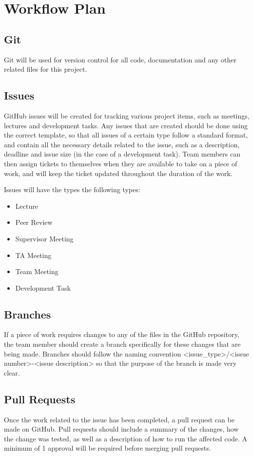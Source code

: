 \documentclass{article}
\begin{document}
\section{Workflow Plan}

\subsection*{Git}
Git will be used for version control for all code, documentation and any other related files for this project.

\subsection*{Issues}
GitHub issues will be created for tracking various project items, such as meetings, lectures and development tasks. Any issues that are created should be done using the correct template, so that all issues of a certain type follow a standard format, and contain all the necessary details related to the issue, such as a description, deadline and issue size (in the case of a development task). Team members can then assign tickets to themselves when they are available to take on a piece of work, and will keep the ticket updated throughout the duration of the work.

Issues will have the types the following types:
\begin{itemize}
    \item Lecture
    \item Peer Review
    \item Supervisor Meeting
    \item TA Meeting
    \item Team Meeting
    \item Development Task
\end{itemize}

\subsection*{Branches}
If a piece of work requires changes to any of the files in the GitHub repository, the team member should create a branch specifically for these changes that are being made. Branches should follow the naming convention <issue\_type>/<issue number>-<issue description> so that the purpose of the branch is made very clear. 

\subsection*{Pull Requests}
Once the work related to the issue has been completed, a pull request can be made on GitHub. Pull requests should include a summary of the changes, how the change was tested, as well as a description of how to run the affected code. A minimum of 1 approval will be required before merging pull requests. 
\end{document}
